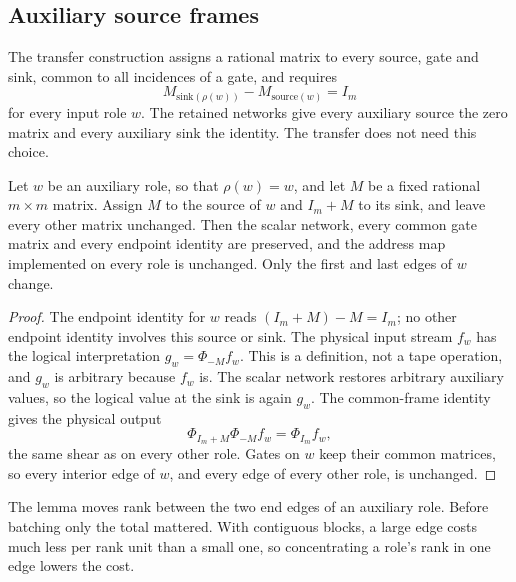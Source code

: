 \subsection{Auxiliary source frames}
\label{sec:scratch-source-frames}

The transfer construction assigns a rational matrix to every source,
gate and sink, common to all incidences of a gate, and requires
\[
 M_{\mathrm{sink}(\rho(w))}-M_{\mathrm{source}(w)}=I_m
\]
for every input role $w$. The retained networks give every auxiliary
source the zero matrix and every auxiliary sink the identity. The transfer
does not need this choice.

\begin{lemma}
\label{lem:scratch-source-frames}
Let $w$ be an auxiliary role, so that $\rho(w)=w$, and let $M$ be a fixed
rational $m\times m$ matrix. Assign $M$ to the source of $w$ and $I_m+M$
to its sink, and leave every other matrix unchanged. Then the scalar
network, every common gate matrix and every endpoint identity are
preserved, and the address map implemented on every role is unchanged.
Only the first and last edges of $w$ change.
\end{lemma}

\begin{proof}
The endpoint identity for $w$ reads $(I_m+M)-M=I_m$; no other endpoint
identity involves this source or sink. The physical input stream $f_w$ has
the logical interpretation $g_w=\Phi_{-M}f_w$. This is a definition, not a
tape operation, and $g_w$ is arbitrary because $f_w$ is. The scalar network
restores arbitrary auxiliary values, so the logical value at the sink is
again $g_w$. The common-frame identity gives the physical output
\[
 \Phi_{I_m+M}\Phi_{-M}f_w=\Phi_{I_m}f_w,
\]
the same shear as on every other role. Gates on $w$ keep their common
matrices, so every interior edge of $w$, and every edge of every other
role, is unchanged.
\end{proof}

The lemma moves rank between the two end edges of an auxiliary role.
Before batching only the total mattered. With contiguous blocks, a large
edge costs much less per rank unit than a small one, so concentrating a
role's rank in one edge lowers the cost.

